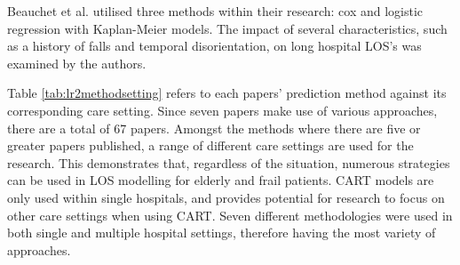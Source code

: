 \documentclass[../thesis.tex]{subfiles}
\begin{document}
Beauchet et al. \cite{Beauchet2018} utilised three methods within their research: cox and logistic regression with Kaplan-Meier models. The impact of several characteristics, such as a history of falls and temporal disorientation, on long hospital LOS's was examined by the authors.

Table \ref{tab:lr2methodsetting} refers to each papers' prediction method against its corresponding care setting. Since seven papers make use of various approaches, there are a total of 67 papers. Amongst the methods where there are five or greater papers published, a range of different care settings are used for the research. This demonstrates that, regardless of the situation, numerous strategies can be used in LOS modelling for elderly and frail patients. CART models are only used within single hospitals, and provides potential for research to focus on other care settings when using CART. Seven different methodologies were used in both single and multiple hospital settings, therefore having the most variety of approaches.
\end{document}
